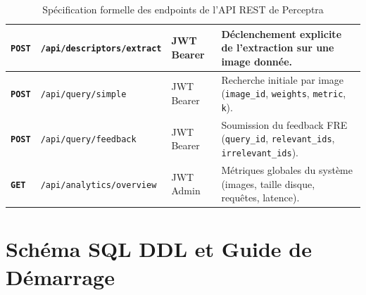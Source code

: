 \begin{table}[H]
\begin{tabularx}{\textwidth}{>{\bfseries}p{1.4cm}p{3.5cm}p{2.1cm}X}
\texttt{POST} & \texttt{/api/descriptors/extract}& JWT Bearer & Déclenchement explicite de l'extraction sur une image donnée. \\
\midrule
\texttt{POST} & \texttt{/api/query/simple} & JWT Bearer & Recherche initiale par image (\texttt{image\_id}, \texttt{weights}, \texttt{metric}, \texttt{k}). \\
\texttt{POST} & \texttt{/api/query/feedback} & JWT Bearer & Soumission du feedback FRE (\texttt{query\_id}, \texttt{relevant\_ids}, \texttt{irrelevant\_ids}). \\
\midrule
\texttt{GET} & \texttt{/api/analytics/overview} & JWT Admin & Métriques globales du système (images, taille disque, requêtes, latence). \\
\bottomrule
\end{tabularx}
\caption{Spécification formelle des endpoints de l'API REST de Perceptra}
\label{tab:api_endpoints_annex}
\end{table}

\section{Schéma SQL DDL et Guide de Démarrage}

